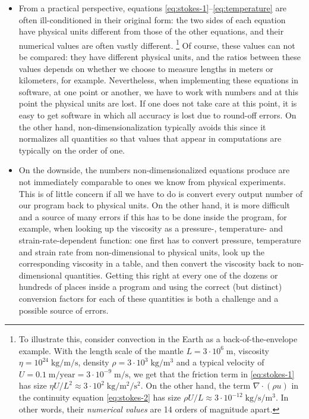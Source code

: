 \documentclass{article}
\begin{document}
\begin{itemize}
  \item From a practical perspective, equations
  \eqref{eq:stokes-1}--\eqref{eq:temperature} are often ill-conditioned in
  their original form: the two sides of each equation have physical units
  different from those of the other equations, and their numerical values are
  often vastly different.%
  \footnote{To illustrate this, consider convection in the Earth as a
  back-of-the-envelope example.
  With the length scale of the mantle $L=3\cdot 10^6\;\text{m}$, viscosity
  $\eta=10^{24} \; \text{kg}/\text{m}/\text{s}$, density $\rho=3\cdot 10^3 \; \text{kg}/\text{m}^3$ and a typical
  velocity of $U=0.1\;\text{m}/\text{year}=3\cdot 10^{-9}\; \text{m}/\text{s}$, we get that the friction
  term in \eqref{eq:stokes-1} has size $\eta U/L^2 \approx 3\cdot 10^2 \;
  \text{kg}/\text{m}^2/\text{s}^2$. On the other hand, the term $\nabla\cdot(\rho u)$ in the
  continuity equation \eqref{eq:stokes-2} has size $\rho U/L\approx 3\cdot
  10^{-12} \; \text{kg}/\text{s}/\text{m}^3$. In other words, their \textit{numerical values} are 14
  orders of magnitude apart.}
  Of course, these values can not be compared: they have different physical
  units, and the ratios between these values depends on whether we choose to
  measure lengths in meters or kilometers, for example. Nevertheless, when
  implementing these equations in software, at one point or another, we have to
  work with numbers and at this point the physical units are lost. If one does
  not take care at this point, it is easy to get software in which all accuracy
  is lost due to round-off errors. On the other hand, non-dimensionalization
  typically avoids this since it normalizes all quantities so that values that
  appear in computations are typically on the order of one.

  \item On the downside, the numbers non-dimensionalized equations produce are
  not immediately comparable to ones we know from physical experiments. This is
  of little concern if all we have to do is convert every output number of our
  program back to physical units. On the other hand, it is more difficult and a
  source of many errors if this has to be done inside the program, for example,
  when looking up the viscosity as a pressure-, temperature- and
  strain-rate-dependent function: one first has to convert pressure,
  temperature and strain rate from non-dimensional to physical units, look up
  the corresponding viscosity in a table, and then convert the viscosity back to
  non-dimensional quantities. Getting this right at every one of the dozens or
  hundreds of places inside a program and using the correct (but distinct)
  conversion factors for each of these quantities is both a challenge and a possible source
  of errors.


\end{itemize}
\end{document}
